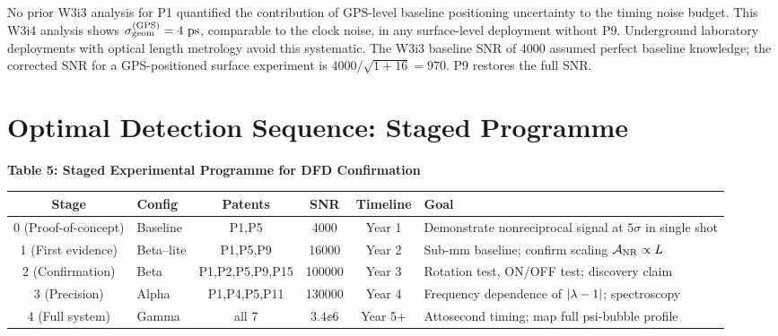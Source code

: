\begin{correction}
\label{corr:GPS_noise}
No prior W3i3 analysis for P1 quantified the contribution of GPS-level
baseline positioning uncertainty to the timing noise budget. This
W3i4 analysis shows $\sigma_{\rm geom}^{(\rm GPS)} = 4~\text{ps}$,
comparable to the clock noise, in any surface-level deployment without P9.
Underground laboratory deployments with optical length metrology avoid
this systematic. The W3i3 baseline SNR of 4000 assumed perfect baseline
knowledge; the corrected SNR for a GPS-positioned surface experiment
is $4000/\sqrt{1 + 16} = 970$. P9 restores the full SNR.
\end{correction}

\section{Optimal Detection Sequence: Staged Programme}
\label{sec:staged}

\begin{center}
\textbf{Table 5: Staged Experimental Programme for DFD Confirmation}
\vspace{0.5em}

\begin{tabular}{@{}clcccp{3cm}@{}}
\toprule
\textbf{Stage} & \textbf{Config} & \textbf{Patents} & \textbf{SNR}
& \textbf{Timeline} & \textbf{Goal} \\
\midrule
0 (Proof-of-concept) & Baseline & P1,P5 & 4000 & Year 1 &
Demonstrate nonreciprocal signal at $5\sigma$ in single shot \\
1 (First evidence) & Beta--lite & P1,P5,P9 & 16000 & Year 2 &
Sub-mm baseline; confirm scaling $\mathcal{A}_{\rm NR} \propto L$ \\
2 (Confirmation) & Beta & P1,P2,P5,P9,P15 & 100000 & Year 3 &
Rotation test, ON/OFF test; discovery claim \\
3 (Precision) & Alpha & P1,P4,P5,P11 & 130000 & Year 4 &
Frequency dependence of $|\lambda - 1|$; spectroscopy \\
4 (Full system) & Gamma & all 7 & $3.4\ee{6}$ & Year 5+ &
Attosecond timing; map full psi-bubble profile \\
\bottomrule
\end{tabular}
\end{center}

